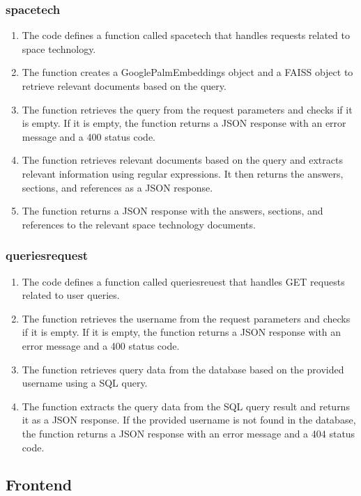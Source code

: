 \documentclass[11pt]{article}
\begin{document}
\subsubsection{spacetech}
\begin{enumerate}
	\item The code defines a function called spacetech that handles requests related to space technology.
	\item The function creates a GooglePalmEmbeddings object and a FAISS object to retrieve relevant documents based on the query.
	\item The function retrieves the query from the request parameters and checks if it is empty. If it is empty, the function returns a JSON response with an error message and a 400 status code.
	\item The function retrieves relevant documents based on the query and extracts relevant information using regular expressions. It then returns the answers, sections, and references as a JSON response.
	\item The function returns a JSON response with the answers, sections, and references to the relevant space technology documents.
\end{enumerate}

\subsubsection{queriesrequest}

\begin{enumerate}
	\item The code defines a function called queriesreuest that handles GET requests related to user queries.
	\item The function retrieves the username from the request parameters and checks if it is empty. If it is empty, the function returns a JSON response with an error message and a 400 status code.
	\item The function retrieves query data from the database based on the provided username using a SQL query.
	\item The function extracts the query data from the SQL query result and returns it as a JSON response.
	      If the provided username is not found in the database, the function returns a JSON response with an error message and a 404 status code.
\end{enumerate}

\subsection{Frontend}
\end{document}
